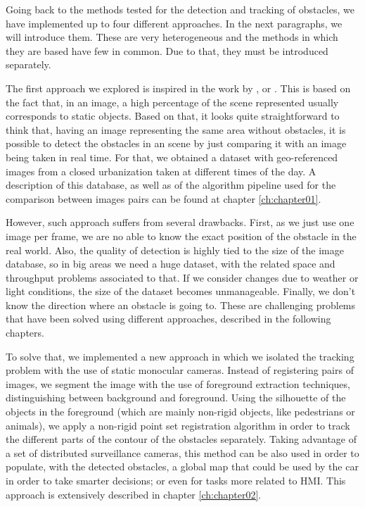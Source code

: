 Going back to the methods tested for the detection and tracking of obstacles, we have implemented up to four different approaches. In the next paragraphs, we will introduce them. These are very heterogeneous and the methods in which they are based have few in common. Due to that, they must be introduced separately.

The first approach we explored is inspired in the work by \cite{primdahl2005change},  \cite{diego2011video} or \cite{vallespi2012prior}. This is based on the fact that, in an image, a high percentage of the scene represented usually corresponds to static objects. Based on that, it looks quite straightforward to think that, having an image representing the same area without obstacles, it is possible to detect the obstacles in an scene by just comparing it with an image being taken in real time. For that, we obtained a dataset with geo-referenced images from a closed urbanization taken at different times of the day. A description of this database, as well as of the algorithm pipeline used for the comparison between images pairs can be found at chapter \ref{ch:chapter01}.

However, such approach suffers from several drawbacks. First, as we just use one image per frame, we are no able to know the exact position of the obstacle in the real world. Also, the quality of detection is highly tied to the size of the image database, so in big areas we need a huge dataset, with the related space and throughput problems associated to that. If we consider changes due to weather or light conditions, the size of the dataset becomes unmanageable. Finally, we don't know the direction where an obstacle is going to. These are challenging problems that have been solved using different approaches, described in the following chapters.

To solve that, we implemented a new approach in which we isolated the tracking problem with the use of static monocular cameras. Instead of registering pairs of images, we segment the image with the use of foreground extraction techniques, distinguishing between background and foreground. Using the silhouette of the objects in the foreground (which are mainly non-rigid objects, like pedestrians or animals), we apply a non-rigid point set registration algorithm in order to track the different parts of the contour of the obstacles separately. 
Taking advantage of a set of distributed surveillance cameras, this method can be also used in order to populate, with the detected obstacles, a global map that could be used by the car in order to take smarter decisions; or even for tasks more related to \ac{HMI}. This approach is extensively described in chapter \ref{ch:chapter02}.

